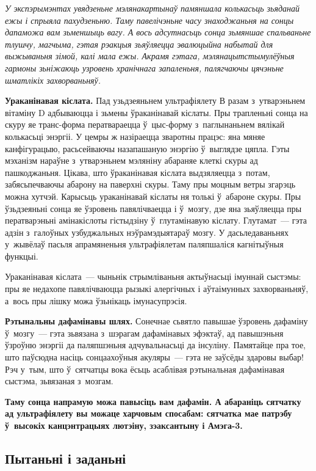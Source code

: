 \emph{У экспэрымэнтах увядзеньне мэлянакартынаў памяншала колькасьць зьяданай ежы і спрыяла пахудзеньню. Таму павелічэньне часу знаходжаньня на сонцы дапаможа вам зьменшыць вагу. А вось адсутнасьць сонца зьмяншае спальваньне тлушчу, магчыма, гэтая рэакцыя зьяўляецца эвалюцыйна набытай для выжываньня зімой, калі мала ежы. Акрамя гэтага, мэлянацытстымулёўныя гармоны зьніжаюць узровень хранічнага запаленьня, палягчаючы цячэньне шматлікіх захворваньняў.} 

\textbf{Ураканінавая кіслата.} Пад узьдзеяньнем ультрафіялету В разам з~утварэньнем вітаміну D адбываюцца і зьмены ўраканінавай кіслаты. Пры трапленьні сонца на скуру яе транс-форма ператвараецца ў~цыс-форму з~паглынаньнем вялікай колькасьці энэргіі. У цемры ж назіраецца зваротны працэс: яна мяняе канфігурацыю, расьсейваючы назапашаную энэргію ў~выглядзе цяпла. Гэты мэханізм нараўне з~утварэньнем мэляніну абараняе клеткі скуры ад пашкоджаньня. Цікава, што ўраканінавая кіслата выдзяляецца з~потам, забясьпечваючы абарону на паверхні скуры. Таму пры моцным ветры згарэць можна хутчэй. Карысьць ураканінавай кіслаты ня толькі ў~абароне скуры. Пры ўзьдзеяньні сонца яе ўзровень павялічваецца і ў~мозгу, дзе яна зьяўляецца пры ператварэньні амінакіслоты гістыдзіну ў~глутамінавую кіслату. Глутамат~--- гэта адзін з~галоўных узбуджальных нэўрамэдыятараў мозгу. У дасьледаваньнях у~жывёлаў пасьля апрамяненьня ультрафіялетам паляпшаліся кагнітыўныя функцыі. 

Ураканінавая кіслата~--- чыньнік стрымліваньня актыўнасьці імуннай сыстэмы: пры яе недахопе павялічваюцца рызыкі алергічных і аўтаімунных захворваньняў, а~вось пры лішку можа ўзьнікаць імунасупрэсія. 

\textbf{Рэтынальны дафамінавы шлях.} Сонечнае сьвятло павышае ўзровень дафаміну ў~мозгу~--- гэта зьвязана з~шэрагам дафамінавых эфэктаў, ад павышэньня ўзроўню энэргіі да паляпшэньня адчувальнасьці да інсуліну. Памятайце пра тое, што паўсюдна насіць сонцаахоўныя акуляры~--- гэта не заўсёды здаровы выбар! Рэч у~тым, што ў~сятчатцы вока ёсьць асаблівая рэтынальная дафамінавая сыстэма, зьвязаная з~мозгам.

\textbf{Таму сонца напрамую можа павысіць вам дафамін. А абараніць сятчатку ад ультрафіялету вы можаце харчовым спосабам: сятчатка мае патрэбу ў~высокіх канцэнтрацыях лютэіну, зэаксантыну і Амэга-3.}

\subsection*{Пытаньні і заданьні}

